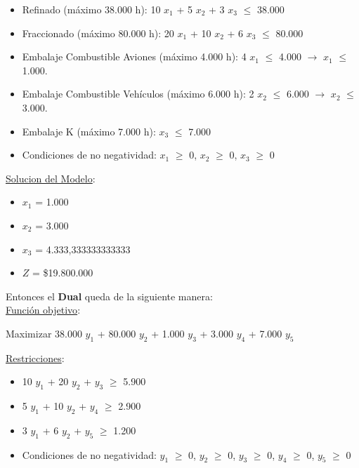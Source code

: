 \documentclass[10pt,a4paper]{article}
\begin{document}
\begin{enumerate}
\begin{itemize}
        \item Refinado (máximo 38.000 h): 10 $x_{1}$ + 5 $x_{2}$ + 3 $x_{3}$ $\leq$ 38.000
        \item Fraccionado (máximo 80.000 h): 20 $x_{1}$ + 10 $x_{2}$ + 6 $x_{3}$ $\leq$ 80.000
        \item Embalaje Combustible Aviones (máximo 4.000 h): 4 $x_{1}$ $\leq$ 4.000 $\rightarrow$ $x_{1}$ $\leq$ 1.000.
        \item Embalaje Combustible Vehículos (máximo 6.000 h): 2 $x_{2}$ $\leq$ 6.000 $\rightarrow$ $x_{2}$ $\leq$ 3.000.
        \item Embalaje K (máximo 7.000 h): $x_{3}$ $\leq$ 7.000
        \item Condiciones de no negatividad: $x_{1}$ $\geq$ 0, $x_{2}$ $\geq$ 0, $x_{3}$ $\geq$ 0\\

    \end{itemize}

    \underline{Solucion del Modelo}: 

    \begin{itemize}

        \item $x_{1}$ = 1.000
        \item $x_{2}$ = 3.000
        \item $x_{3}$ = 4.333,333333333333
        \item $Z$ = \$19.800.000\\

    \end{itemize}

    \vspace{0.5em}

    Entonces el \textbf{Dual} queda de la siguiente manera: \\

    \underline{Función objetivo}: 

    \begin{center}
        
        Maximizar 38.000 $y_{1}$ + 80.000 $y_{2}$ + 1.000 $y_{3}$ + 3.000 $y_{4}$ + 7.000 $y_{5}$

    \end{center}

    \underline{Restricciones}: 

    \begin{itemize}

        \item 10 $y_{1}$ + 20 $y_{2}$ + $y_{3}$ $\geq$ 5.900
        \item 5 $y_{1}$ + 10 $y_{2}$ + $y_{4}$ $\geq$ 2.900
        \item 3 $y_{1}$ + 6 $y_{2}$ + $y_{5}$ $\geq$ 1.200
        \item Condiciones de no negatividad: $y_{1}$ $\geq$ 0, $y_{2}$ $\geq$ 0, $y_{3}$ $\geq$ 0, $y_{4}$ $\geq$ 0, $y_{5}$ $\geq$ 0\\


\end{itemize}
\end{enumerate}
\end{document}
